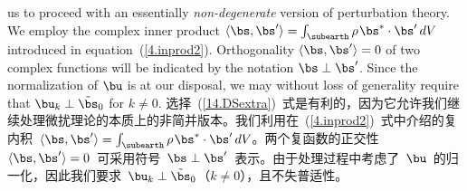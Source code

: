 us to proceed with an essentially {\em non-degenerate\/} version
of perturbation theory.  We employ the complex inner product
$\langle\bs,\bs'\rangle=\int_{\subearth}\rho\hspace{0.3 mm}
\bs^*\cdot\bs'\,dV$ introduced in equation~(\ref{4.inprod2}).
Orthogonality $\langle\bs,\bs'\rangle=0$ of two complex
functions will be indicated by the notation $\bs\perp\bs'$.
Since the normalization of $\bu$ is at our disposal,
we may without loss of generality require that
$\bu_k\perp\tilde{\bs}_0$ for $k\not=0$.
\fi
选择~(\ref{14.DSextra})~式是有利的，因为它允许我们继续处理微扰理论的本质上的非简并版本。我们利用在~(\ref{4.inprod2})~式中介绍的复内积~$\langle\bs,\bs'\rangle=\int_{\subearth}\rho\hspace{0.3 mm}
\bs^*\cdot\bs'\,dV$。两个复函数的正交性~$\langle\bs,\bs'\rangle=0$~可采用符号~$\bs\perp\bs'$~表示。由于处理过程中考虑了~$\bu$~的归一化，因此我们要求~$\bu_k\perp\tilde{\bs}_0$（$k\not=0$），且不失普适性。

